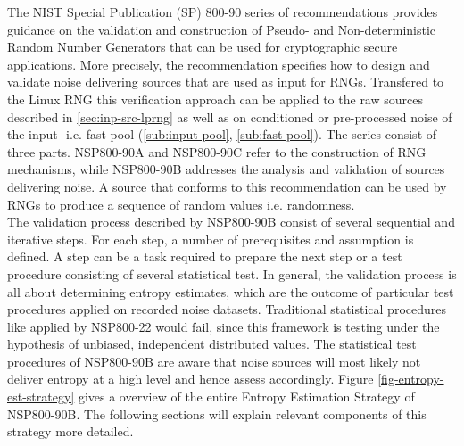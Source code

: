 The NIST Special Publication (SP) 800-90 series of recommendations provides 
guidance on the validation and construction of Pseudo- and Non-deterministic Random Number Generators that can be used for cryptographic secure applications. More precisely, the recommendation specifies how to design and validate noise delivering sources that are used as input for RNGs. Transfered to the Linux RNG this verification approach can be applied to the raw sources described in \ref{sec:inp-src-lprng} as well as on conditioned or pre-processed noise of the input- i.e. fast-pool (\ref{sub:input-pool}, \ref{sub:fast-pool}). The series consist of three parts. NSP800-90A and NSP800-90C refer to the construction of RNG mechanisms, while NSP800-90B addresses the analysis and validation of sources delivering noise. A source that conforms to this recommendation can be used by RNGs to produce a sequence of random values \cite{rukhin2010nist} i.e. randomness.\\
The validation process described by NSP800-90B consist of several sequential and iterative steps. For each step, a number of prerequisites and assumption is defined. A step can be a task required to prepare the next step or a test procedure consisting of several statistical test. In general, the validation process is all about determining entropy estimates, which are the outcome of particular test procedures applied on recorded noise datasets. Traditional statistical procedures like applied by NSP800-22 would fail, since this framework is testing under the hypothesis of unbiased, independent distributed values. The statistical test procedures of NSP800-90B are aware that noise sources will most likely not deliver entropy at a high level and hence assess accordingly. Figure \ref{fig-entropy-est-strategy} gives a overview of the entire Entropy Estimation Strategy of NSP800-90B. The following sections will explain relevant components of this strategy more detailed.

